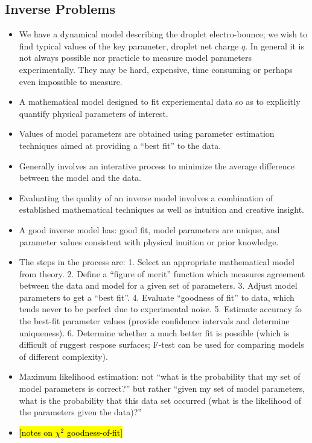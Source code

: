 \documentclass[10pt,a4paper]{article}
\begin{document}
\subsection*{Inverse Problems}
\begin{itemize}
\item We have a dynamical model describing the droplet electro-bounce; we wish to find typical values of the key parameter, droplet net charge $q$. In general it is not always possible nor practicle to measure model parameters experimentally. They may be hard, expensive, time consuming or perhaps even impossible to measure. 
\item A mathematical model designed to fit experiemental data so as to explicitly quantify physical parameters of interest.
\item Values of model parameters are obtained using parameter estimation techniques aimed at providing a ``best fit'' to the data.
\item Generally involves an interative process to minimize the average difference between the model and the data.
\item Evaluating the quality of an inverse model involves a combination of established mathematical techniques as well as intuition and creative insight.
\item A good inverse model has: good fit, model parameters are unique, and parameter values consistent with physical inuition or prior knowledge.
\item The steps in the process are: 1. Select an appropriate mathematical model from theory. 2. Define a ``figure of merit'' function which measures agreement between the data and model for a given set of parameters. 3. Adjust model parameters to get a ``best fit''. 4. Evaluate ``goodness of fit'' to data, which tends never to be perfect due to experimental noise. 5. Estimate accuracy fo the best-fit parameter values (provide confidence intervals and determine uniqueness). 6. Determine whether a much better fit is possible (which is difficult of ruggest respose surfaces; F-test can be used for comparing models of different complexity).

\item Maximum likelihood estimation: not ``what is the probability that my set of model parameters is correct?'' but rather ``given my set of model parameters, what is the probability that this data set occurred (what is the likelihood of the parameters given the data)?''

\item \hl{[notes on $\chi^2$ goodness-of-fit]} 


\end{itemize}
\end{document}

